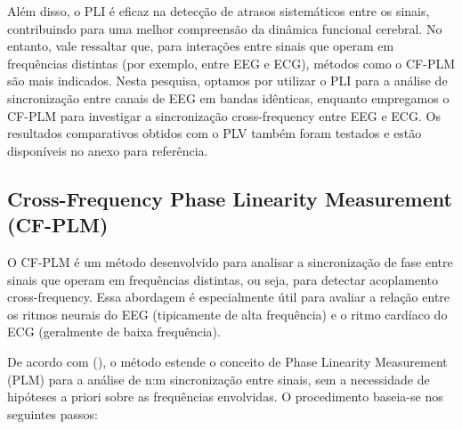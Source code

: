 Além disso, o PLI é eficaz na detecção de atrasos sistemáticos entre os sinais, contribuindo para uma melhor compreensão da dinâmica funcional cerebral. No entanto, vale ressaltar que, para interações entre sinais que operam em frequências distintas (por exemplo, entre EEG e ECG), métodos como o CF-PLM são mais indicados. Nesta pesquisa, optamos por utilizar o PLI para a análise de sincronização entre canais de EEG em bandas idênticas, enquanto empregamos o CF-PLM para investigar a sincronização cross-frequency entre EEG e ECG. Os resultados comparativos obtidos com o PLV também foram testados e estão disponíveis no anexo para referência.

\subsection{Cross-Frequency Phase Linearity Measurement (CF-PLM)}

O CF-PLM é um método desenvolvido para analisar a sincronização de fase entre sinais que operam em frequências distintas, ou seja, para detectar acoplamento cross-frequency. Essa abordagem é especialmente útil para avaliar a relação entre os ritmos neurais do EEG (tipicamente de alta frequência) e o ritmo cardíaco do ECG (geralmente de baixa frequência). 

De acordo com \citeauthor{sorrentino2022} (\citeyear{sorrentino2022}), o método estende o conceito de Phase Linearity Measurement (PLM) para a análise de n:m sincronização entre sinais, sem a necessidade de hipóteses a priori sobre as frequências envolvidas. O procedimento baseia-se nos seguintes passos:

